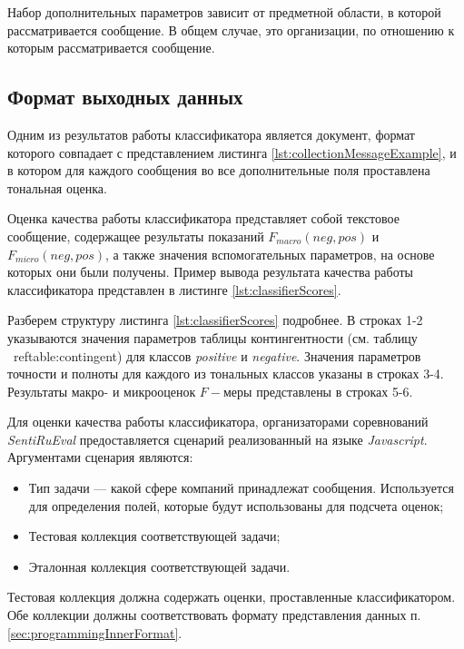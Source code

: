     Набор дополнительных параметров зависит от предметной области, в которой
    рассматривается сообщение. В общем случае, это организации, по отношению к
    которым рассматривается сообщение.

    \subsection{Формат выходных данных}
    Одним из результатов работы классификатора является \xml
    документ, формат которого совпадает с представлением листинга \ref{lst:collectionMessageExample},
    и в котором для каждого сообщения во все дополнительные поля проставлена
    тональная оценка.

    Оценка качества работы классификатора представляет собой текстовое сообщение,
    содержащее результаты показаний  $F_{macro}(neg, pos)$ и $F_{micro}(neg, pos)$,
    а также значения вспомогательных параметров, на основе которых они были
    получены. Пример вывода результата качества работы классификатора представлен
    в листинге \ref{lst:classifierScores}.

    \lstset{style=bash, numbers=left}
    

    Разберем структуру листинга \ref{lst:classifierScores} подробнее. В строках 1-2
    указываются значения параметров таблицы контингентности (см. таблицу \
    ref{table:contingent}) для классов {\it positive} и {\it negative}. Значения параметров точности и
    полноты для каждого из тональных классов указаны в строках 3-4. Результаты
    макро- и микрооценок $F-$меры представлены в строках 5-6.

    Для оценки качества работы классификатора, организаторами соревнований
    {\it SentiRuEval} предоставляется сценарий реализованный на языке {\it Javascript}.
    Аргументами сценария являются:
    \begin{itemize}
        \item Тип задачи --- какой сфере компаний принадлежат сообщения. Используется
            для определения полей, которые будут использованы для подсчета оценок;
        \item Тестовая коллекция соответствующей задачи;
        \item Эталонная коллекция соответствующей задачи.
    \end{itemize}

    Тестовая коллекция должна содержать оценки, проставленные классификатором.
    Обе коллекции должны соответствовать формату представления данных п.
    \ref{sec:programmingInnerFormat}.
